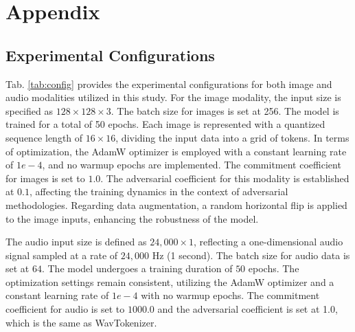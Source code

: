 \clearpage
\setcounter{page}{1}
\maketitlesupplementary

\section{Appendix}

\subsection{Experimental Configurations}
\label{appendix:config}

Tab. \ref{tab:config} provides the experimental configurations for both image and audio modalities utilized in this study. For the image modality, the input size is specified as $128 \times 128 \times 3$. The batch size for images is set at 256. The model is trained for a total of 50 epochs. Each image is represented with a quantized sequence length of $16 \times 16$, dividing the input data into a grid of tokens. In terms of optimization, the AdamW optimizer is employed with a constant learning rate of $1e-4$, and no warmup epochs are implemented. The commitment coefficient for images is set to $1.0$. The adversarial coefficient for this modality is established at $0.1$, affecting the training dynamics in the context of adversarial methodologies. Regarding data augmentation, a random horizontal flip is applied to the image inputs, enhancing the robustness of the model.

The audio input size is defined as $24,000 \times 1$, reflecting a one-dimensional audio signal sampled at a rate of $24,000$ Hz (1 second). The batch size for audio data is set at $64$. The model undergoes a training duration of $50$ epochs. The optimization settings remain consistent, utilizing the AdamW optimizer and a constant learning rate of $1e-4$ with no warmup epochs. The commitment coefficient for audio is set to $1000.0$ and the adversarial coefficient is set at 1.0, which is the same as WavTokenizer.


